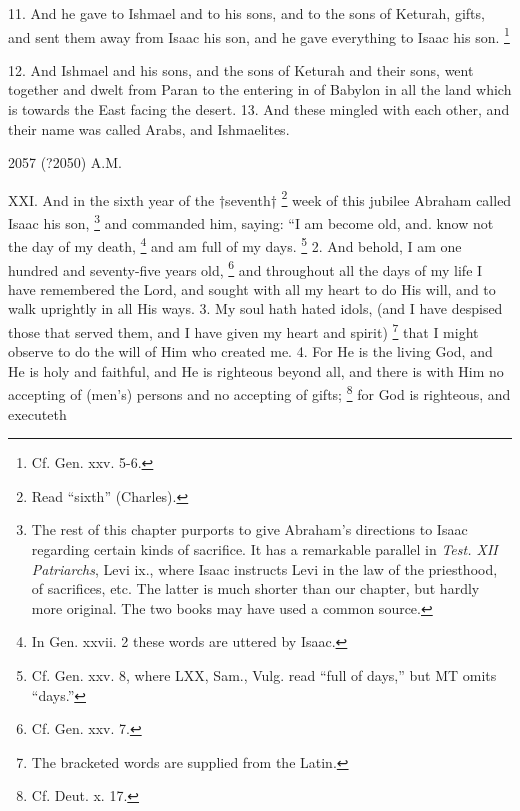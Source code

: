 11. And he gave to Ishmael and to his sons, and to the sons of Keturah, gifts, and sent them away from Isaac his son, and he gave everything to Isaac his son. \footnote{Cf. Gen. xxv. 5-6.}


12. And Ishmael and his sons, and the sons of Keturah and their sons, went together and dwelt from Paran to the entering in of Babylon in all the land which is towards the East facing the desert. 13. And these mingled with each other, and their name was called Arabs, and Ishmaelites.


2057 (?2050) A.M.

XXI. And in the sixth year of the †seventh† \footnote{Read ``sixth'' (Charles).} week of this jubilee Abraham called Isaac his son, \footnote{The rest of this chapter purports to give Abraham's directions to Isaac regarding certain kinds of sacrifice. It has a remarkable parallel in \emph{Test. XII Patriarchs}, Levi ix., where Isaac instructs Levi in the law of the priesthood, of sacrifices, etc. The latter is much shorter than our chapter, but hardly more original. The two books may have used a common source.} and commanded him, saying: ``I am become old, and. know not the day of my death, \footnote{In Gen. xxvii. 2 these words are uttered by Isaac.} and am full of my days. \footnote{Cf. Gen. xxv. 8, where LXX, Sam., Vulg. read ``full of days,'' but MT omits ``days.''} 2. And behold, I am one hundred and seventy-five years old, \footnote{Cf. Gen. xxv. 7.} and throughout all the days of my life I have remembered the Lord, and sought with all my heart to do His will, and to walk uprightly in all His ways. 3. My soul hath hated idols, (and I have despised those that served them, and I have given my heart and spirit) \footnote{The bracketed words are supplied from the Latin.} that I might observe to do the will of Him who created me. 4. For He is the living God, and He is holy and faithful, and He is righteous beyond all, and there is with Him no accepting of (men's) persons and no accepting of gifts; \footnote{Cf. Deut. x. 17.} for God is righteous, and executeth

